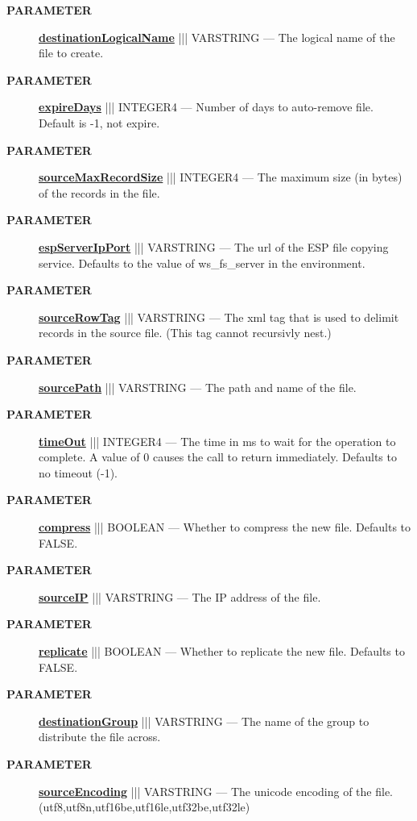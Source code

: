 \par
\begin{description}
\item [\colorbox{tagtype}{\color{white} \textbf{\textsf{PARAMETER}}}] \textbf{\underline{destinationLogicalName}} ||| VARSTRING --- The logical name of the file to create.
\item [\colorbox{tagtype}{\color{white} \textbf{\textsf{PARAMETER}}}] \textbf{\underline{expireDays}} ||| INTEGER4 --- Number of days to auto-remove file. Default is -1, not expire.
\item [\colorbox{tagtype}{\color{white} \textbf{\textsf{PARAMETER}}}] \textbf{\underline{sourceMaxRecordSize}} ||| INTEGER4 --- The maximum size (in bytes) of the records in the file.
\item [\colorbox{tagtype}{\color{white} \textbf{\textsf{PARAMETER}}}] \textbf{\underline{espServerIpPort}} ||| VARSTRING --- The url of the ESP file copying service. Defaults to the value of ws\_fs\_server in the environment.
\item [\colorbox{tagtype}{\color{white} \textbf{\textsf{PARAMETER}}}] \textbf{\underline{sourceRowTag}} ||| VARSTRING --- The xml tag that is used to delimit records in the source file. (This tag cannot recursivly nest.)
\item [\colorbox{tagtype}{\color{white} \textbf{\textsf{PARAMETER}}}] \textbf{\underline{sourcePath}} ||| VARSTRING --- The path and name of the file.
\item [\colorbox{tagtype}{\color{white} \textbf{\textsf{PARAMETER}}}] \textbf{\underline{timeOut}} ||| INTEGER4 --- The time in ms to wait for the operation to complete. A value of 0 causes the call to return immediately. Defaults to no timeout (-1).
\item [\colorbox{tagtype}{\color{white} \textbf{\textsf{PARAMETER}}}] \textbf{\underline{compress}} ||| BOOLEAN --- Whether to compress the new file. Defaults to FALSE.
\item [\colorbox{tagtype}{\color{white} \textbf{\textsf{PARAMETER}}}] \textbf{\underline{sourceIP}} ||| VARSTRING --- The IP address of the file.
\item [\colorbox{tagtype}{\color{white} \textbf{\textsf{PARAMETER}}}] \textbf{\underline{replicate}} ||| BOOLEAN --- Whether to replicate the new file. Defaults to FALSE.
\item [\colorbox{tagtype}{\color{white} \textbf{\textsf{PARAMETER}}}] \textbf{\underline{destinationGroup}} ||| VARSTRING --- The name of the group to distribute the file across.
\item [\colorbox{tagtype}{\color{white} \textbf{\textsf{PARAMETER}}}] \textbf{\underline{sourceEncoding}} ||| VARSTRING --- The unicode encoding of the file. (utf8,utf8n,utf16be,utf16le,utf32be,utf32le)

\end{description}
